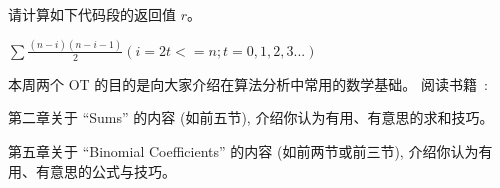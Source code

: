 \documentclass[a4paper, justified]{tufte-handout}
\begin{document}
\beginoptional

\begin{problem}[Summation]
请计算如下代码段的返回值 $r$。


\end{problem}

\begin{solution}
  $\sum\frac{(n-i)(n-i-1)}{2}(i=2t<=n; t = 0,1,2,3...)$
\end{solution}

\beginot

本周两个 OT 的目的是向大家介绍在算法分析中常用的数学基础。
阅读书籍~\cite{Book:GKP}:
\begin{ot}[Sums]
  第二章关于 ``Sums'' 的内容 (如前五节), 介绍你认为有用、有意思的求和技巧。
\end{ot}

\vspace{0.50cm}
\begin{ot}
  第五章关于 ``Binomial Coefficients'' 的内容 (如前两节或前三节), 介绍你认为有用、有意思的公式与技巧。
\end{ot}




\beginfb



\end{document}

